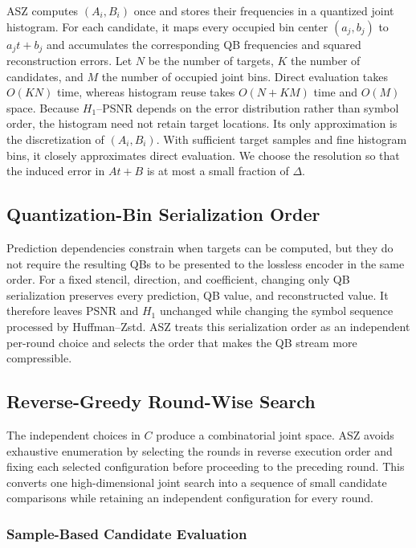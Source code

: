 ASZ computes $(A_i,B_i)$ once and stores their frequencies in a quantized joint histogram. For each candidate, it maps every occupied bin center $(a_j,b_j)$ to $a_jt+b_j$ and accumulates the corresponding QB frequencies and squared reconstruction errors. Let $N$ be the number of targets, $K$ the number of candidates, and $M$ the number of occupied joint bins. Direct evaluation takes $O(KN)$ time, whereas histogram reuse takes $O(N+KM)$ time and $O(M)$ space. Because $H_1$--PSNR depends on the error distribution rather than symbol order, the histogram need not retain target locations. Its only approximation is the discretization of $(A_i,B_i)$. With sufficient target samples and fine histogram bins, it closely approximates direct evaluation. We choose the resolution so that the induced error in $At+B$ is at most a small fraction of $\Delta$.

\subsection{Quantization-Bin Serialization Order}

Prediction dependencies constrain when targets can be computed, but they do not require the resulting QBs to be presented to the lossless encoder in the same order. For a fixed stencil, direction, and coefficient, changing only QB serialization preserves every prediction, QB value, and reconstructed value. It therefore leaves PSNR and $H_1$ unchanged while changing the symbol sequence processed by Huffman--Zstd. ASZ treats this serialization order as an independent per-round choice and selects the order that makes the QB stream more compressible.


\subsection{Reverse-Greedy Round-Wise Search}
\label{sec:configuration-space:reverse-greedy}

The independent choices in $C$ produce a combinatorial joint space. ASZ avoids exhaustive enumeration by selecting the rounds in reverse execution order and fixing each selected configuration before proceeding to the preceding round. This converts one high-dimensional joint search into a sequence of small candidate comparisons while retaining an independent configuration for every round.

\subsubsection{Sample-Based Candidate Evaluation}
\label{sec:configuration-space:sample-evaluation}

